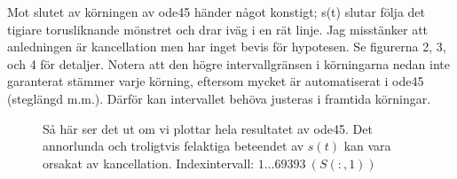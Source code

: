 \documentclass[a4paper]{article}
\begin{document}



Mot slutet av körningen av ode45 händer något konstigt; s(t) slutar följa det
tigiare torusliknande mönstret och drar iväg i en rät linje. Jag misstänker att
anledningen är kancellation men har inget bevis för hypotesen. Se figurerna 2,
3, och 4 för detaljer. Notera att den högre intervallgränsen i körningarna nedan inte garanterat
stämmer varje körning, eftersom mycket är automatiserat i ode45 (steglängd
m.m.). Därför kan intervallet behöva justeras i framtida körningar.

\begin{figure}[H]
  \caption{Så här ser det ut om vi plottar hela resultatet av ode45. Det
    annorlunda och troligtvis felaktiga beteendet av $s(t)$ kan vara orsakat av
  kancellation. Indexintervall: $1\ldots69393\ (S(:,1))$}
  \begin{centering}
    \setlength\fboxsep{0pt}
    \setlength\fboxrule{0.5pt}

\end{centering}
\end{figure}
\end{document}
